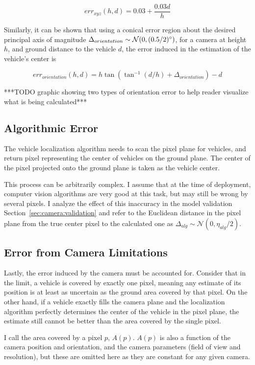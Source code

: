 \documentclass[a4paper,12pt,twoside,openright]{report}
\begin{document}
\[ err_{xyz}(h, d) = 0.03 + \frac{0.03d}{h} \]

Similarly, it can be shown that using a conical error region about the desired principal axis
of magnitude $\Delta_{orientation} \sim \mathcal{N}(0,(0.5/2)\degree)$, 
for a camera at height $h$, and ground distance to the vehicle $d$, the
error induced in the estimation of the vehicle's center is 

\[ err_{orientation}(h, d) = h\tan(\tan^{-1}(d/h) + \Delta_{orientation}) - d \] %


***TODO graphic showing two types of orientation error to help reader visualize what is being calculated***


\subsection{Algorithmic Error}

The vehicle localization algorithm needs to scan the pixel plane for vehicles,
and return pixel representing the center of vehicles on the ground plane.
The center of the pixel projected onto the ground plane is taken as the vehicle center.

This process can be arbitrarily complex. I assume that at the time of deployment, 
computer vision algorithms are very good at this task, but may still
be wrong by several pixels. I analyze the effect of this inaccuracy
in the model validation Section~\ref{sec:camera:validation} and refer to the Euclidean distance
in the pixel plane from the true center pixel to the calculated one
as $\Delta_{alg} \sim \mathcal{N}(0, \eta_{alg}/2)$.

\subsection{Error from Camera Limitations}

Lastly, the error induced by the camera must be accounted for. Consider that 
in the limit, a vehicle is covered by exactly one pixel, meaning any estimate
of its position is at least as uncertain as the ground area 
covered by that pixel. On the other hand, if a vehicle
exactly fills the camera plane and the localization algorithm perfectly determines
the center of the vehicle in the pixel plane, the estimate still cannot
be better than the area covered by the single pixel.

I call the area covered by a pixel $p$, $A(p)$. $A(p)$ is also a function of the camera
position and orientation, and the camera parameters (field of view and resolution),
but these are omitted here as they are constant for any given camera.
\end{document}
